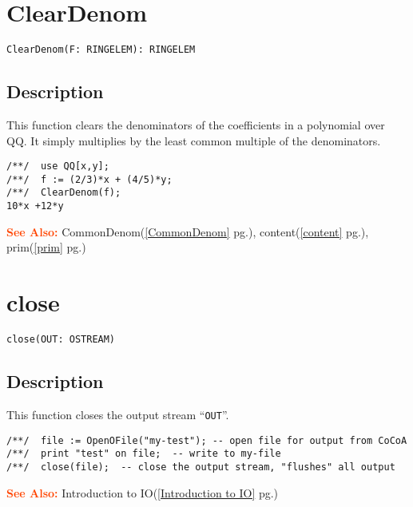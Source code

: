 \documentclass[a4paper]{mybook}
\newenvironment{command}{}{} %
\newcommand\SeeAlso{\par\textcolor{OrangeRed}{\textbf{\large See Also: }}}
\begin{document}
\section{ClearDenom}
\label{ClearDenom}
\begin{command} %


\begin{Verbatim}[label=syntax, rulecolor=\color{MidnightBlue},
frame=single]
ClearDenom(F: RINGELEM): RINGELEM
\end{Verbatim}


\subsection*{Description}

This function clears the denominators of the coefficients in a
polynomial over QQ.  It simply multiplies by the least common multiple
of the denominators.
\begin{Verbatim}[label=example, rulecolor=\color{PineGreen}, frame=single]
/**/  use QQ[x,y];
/**/  f := (2/3)*x + (4/5)*y;
/**/  ClearDenom(f);
10*x +12*y
\end{Verbatim}


\SeeAlso %
  CommonDenom(\ref{CommonDenom} pg.\pageref{CommonDenom}), 
    content(\ref{content} pg.\pageref{content}), 
    prim(\ref{prim} pg.\pageref{prim})
\end{command} %

\section{close}
\label{close}
\begin{command} %


\begin{Verbatim}[label=syntax, rulecolor=\color{MidnightBlue},
frame=single]
close(OUT: OSTREAM)
\end{Verbatim}


\subsection*{Description}

This function closes the output stream ``\verb&OUT&''.
\begin{Verbatim}[label=example, rulecolor=\color{PineGreen}, frame=single]
/**/  file := OpenOFile("my-test"); -- open file for output from CoCoA
/**/  print "test" on file;  -- write to my-file
/**/  close(file);  -- close the output stream, "flushes" all output
\end{Verbatim}


\SeeAlso %
  Introduction to IO(\ref{Introduction to IO} pg.\pageref{Introduction to IO})
\end{command} %
\end{document}
